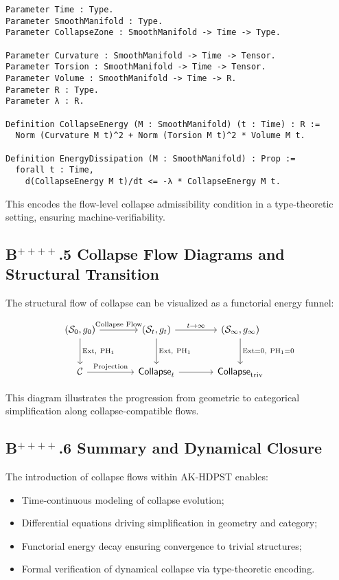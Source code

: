 \documentclass[11pt]{article}
\begin{document}
\begin{lstlisting}[language=Coq, caption={Collapse Flow Formalization in Coq}]
Parameter Time : Type.
Parameter SmoothManifold : Type.
Parameter CollapseZone : SmoothManifold -> Time -> Type.

Parameter Curvature : SmoothManifold -> Time -> Tensor.
Parameter Torsion : SmoothManifold -> Time -> Tensor.
Parameter Volume : SmoothManifold -> Time -> R.
Parameter R : Type.
Parameter λ : R.

Definition CollapseEnergy (M : SmoothManifold) (t : Time) : R :=
  Norm (Curvature M t)^2 + Norm (Torsion M t)^2 * Volume M t.

Definition EnergyDissipation (M : SmoothManifold) : Prop :=
  forall t : Time,
    d(CollapseEnergy M t)/dt <= -λ * CollapseEnergy M t.
\end{lstlisting}

This encodes the flow-level collapse admissibility condition in a type-theoretic setting, ensuring machine-verifiability.

\subsection*{B$^{++++}$.5 Collapse Flow Diagrams and Structural Transition}

The structural flow of collapse can be visualized as a functorial energy funnel:

\[
\begin{tikzcd}[row sep=large, column sep=large]
(\mathcal{S}_0, g_0)
  \arrow[r, "{\text{Collapse Flow}}"]
  \arrow[d, "{\text{Ext},\ \mathrm{PH}_1}"] &
(\mathcal{S}_t, g_t)
  \arrow[r, "{t \to \infty}"]
  \arrow[d, "{\text{Ext},\ \mathrm{PH}_1}"] &
(\mathcal{S}_\infty, g_\infty)
  \arrow[d, "{\text{Ext} = 0,\ \mathrm{PH}_1 = 0}"] \\
\mathcal{C}
  \arrow[r, "{\text{Projection}}"] &
\mathsf{Collapse}_t
  \arrow[r] &
\mathsf{Collapse}_{\mathrm{triv}}
\end{tikzcd}
\]


This diagram illustrates the progression from geometric to categorical simplification along collapse-compatible flows.

\subsection*{B$^{++++}$.6 Summary and Dynamical Closure}

The introduction of collapse flows within AK-HDPST enables:
\begin{itemize}
  \item Time-continuous modeling of collapse evolution;
  \item Differential equations driving simplification in geometry and category;
  \item Functorial energy decay ensuring convergence to trivial structures;
  \item Formal verification of dynamical collapse via type-theoretic encoding.
\end{itemize}
\end{document}
